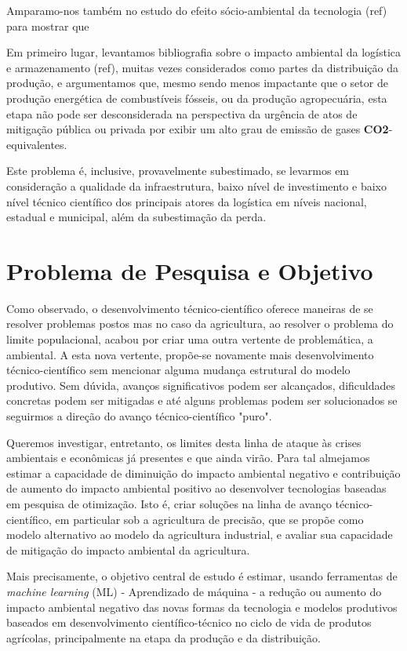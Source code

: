\documentclass[14pt,a4paper]{article}
\begin{document}
		Amparamo-nos também no estudo do efeito sócio-ambiental da tecnologia (ref) para mostrar que 
		
		Em primeiro lugar, levantamos bibliografia sobre o impacto ambiental da logística e armazenamento (ref), muitas vezes considerados como partes da distribuição da produção, e argumentamos que, mesmo sendo menos impactante que o setor de produção energética de combustíveis fósseis, ou da produção agropecuária, esta etapa não pode ser desconsiderada na perspectiva da urgência de atos de mitigação pública ou privada por exibir um alto grau de emissão de gases \textbf{CO2}-equivalentes. 
		
		Este problema é, inclusive, provavelmente subestimado, se levarmos em consideração a qualidade da infraestrutura, baixo nível de investimento e baixo nível técnico científico dos principais atores da logística em níveis nacional, estadual e municipal, além da subestimação da perda. 


	\section{Problema de Pesquisa e Objetivo}

		Como observado, o desenvolvimento técnico-científico oferece maneiras de se resolver problemas postos mas no caso da agricultura, ao resolver o problema do limite populacional, acabou por criar uma outra vertente de problemática, a ambiental. A esta nova vertente, propõe-se novamente mais desenvolvimento técnico-científico sem mencionar alguma mudança estrutural do modelo produtivo. Sem dúvida, avanços significativos podem ser alcançados, dificuldades concretas podem ser mitigadas e até alguns problemas podem ser solucionados se seguirmos a direção do avanço técnico-científico "puro". 
		
		Queremos investigar, entretanto, os limites desta linha de ataque às crises ambientais e econômicas já presentes e que ainda virão. Para tal almejamos estimar a capacidade de diminuição do impacto ambiental negativo e contribuição de aumento do impacto ambiental positivo ao desenvolver tecnologias baseadas em pesquisa de otimização. Isto é, criar soluções na linha de avanço técnico-científico, em particular sob a agricultura de precisão, que se propõe como modelo alternativo ao modelo da agricultura industrial, e avaliar sua capacidade de mitigação do impacto ambiental da agricultura.
		
		Mais precisamente, o objetivo central de estudo é estimar, usando ferramentas de \textit{machine learning} (ML) - Aprendizado de máquina - a redução ou aumento do impacto ambiental negativo das novas formas da tecnologia e modelos produtivos baseados em desenvolvimento científico-técnico no ciclo de vida de produtos agrícolas, principalmente na etapa da produção e da distribuição. 
		
\end{document}
